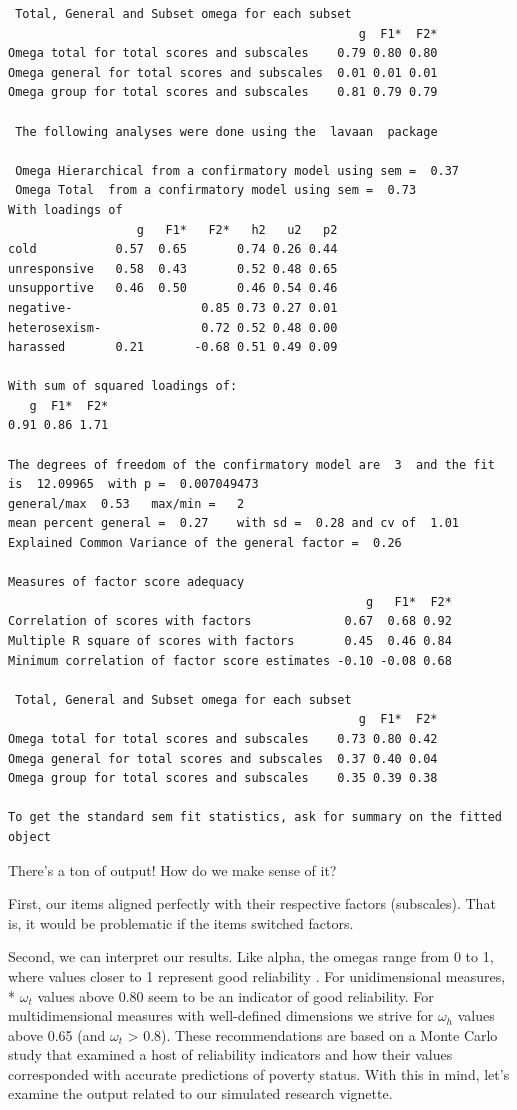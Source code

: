 \documentclass[
  english,
]{book}
\begin{document}
\begin{verbatim}
 Total, General and Subset omega for each subset
                                                 g  F1*  F2*
Omega total for total scores and subscales    0.79 0.80 0.80
Omega general for total scores and subscales  0.01 0.01 0.01
Omega group for total scores and subscales    0.81 0.79 0.79

 The following analyses were done using the  lavaan  package 

 Omega Hierarchical from a confirmatory model using sem =  0.37
 Omega Total  from a confirmatory model using sem =  0.73 
With loadings of 
                  g   F1*   F2*   h2   u2   p2
cold           0.57  0.65       0.74 0.26 0.44
unresponsive   0.58  0.43       0.52 0.48 0.65
unsupportive   0.46  0.50       0.46 0.54 0.46
negative-                  0.85 0.73 0.27 0.01
heterosexism-              0.72 0.52 0.48 0.00
harassed       0.21       -0.68 0.51 0.49 0.09

With sum of squared loadings of:
   g  F1*  F2* 
0.91 0.86 1.71 

The degrees of freedom of the confirmatory model are  3  and the fit is  12.09965  with p =  0.007049473
general/max  0.53   max/min =   2
mean percent general =  0.27    with sd =  0.28 and cv of  1.01 
Explained Common Variance of the general factor =  0.26 

Measures of factor score adequacy             
                                                  g   F1*  F2*
Correlation of scores with factors             0.67  0.68 0.92
Multiple R square of scores with factors       0.45  0.46 0.84
Minimum correlation of factor score estimates -0.10 -0.08 0.68

 Total, General and Subset omega for each subset
                                                 g  F1*  F2*
Omega total for total scores and subscales    0.73 0.80 0.42
Omega general for total scores and subscales  0.37 0.40 0.04
Omega group for total scores and subscales    0.35 0.39 0.38

To get the standard sem fit statistics, ask for summary on the fitted object
\end{verbatim}

There's a ton of output! How do we make sense of it?

First, our items aligned perfectly with their respective factors (subscales). That is, it would be problematic if the items switched factors.

Second, we can interpret our results. Like alpha, the omegas range from 0 to 1, where values closer to 1 represent good reliability \citep{najera_catalan_reliability_2019}. For unidimensional measures, * \(\omega_{t}\) values above 0.80 seem to be an indicator of good reliability. For multidimensional measures with well-defined dimensions we strive for \(\omega_{h}\) values above 0.65 (and \(\omega_{t}\) \textgreater{} 0.8). These recommendations are based on a Monte Carlo study that examined a host of reliability indicators and how their values corresponded with accurate predictions of poverty status. With this in mind, let's examine the output related to our simulated research vignette.
\end{document}
